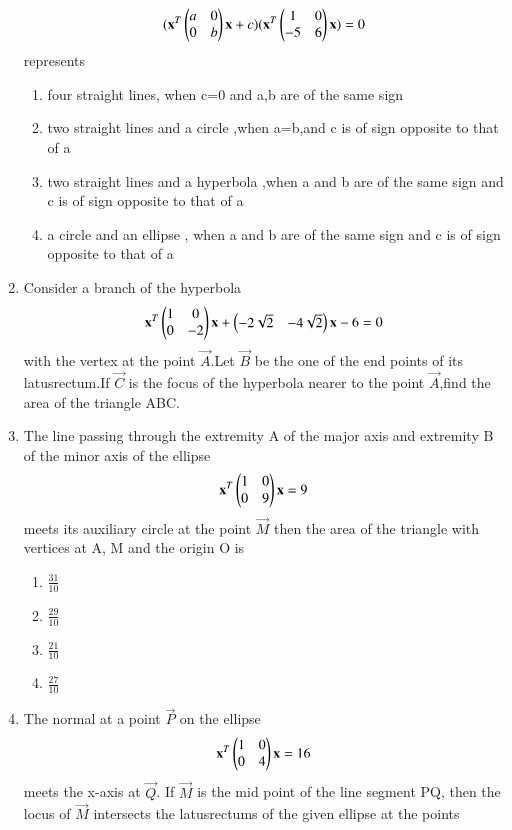 \begin{enumerate}[label=\arabic*.,ref=\thesubsection.\theenumi]
\begin{align}
    (\mathbf{x}^T\begin{pmatrix} a&0\\0&b \end{pmatrix}\mathbf{x}+c)(\mathbf{x}^T\begin{pmatrix}1&0\\-5&6\end{pmatrix} \mathbf{x})=0
    \end{align}represents
    \begin{enumerate}
    \item four straight lines, when c=0 and a,b are of the same sign 
    \item two straight lines and a circle ,when a=b,and c is of sign opposite to that of a
    \item two straight lines and a hyperbola ,when a and b are of the same sign and c is of sign 		opposite to that of a 
    \item a circle and an ellipse , when a and b are of the same sign and c is of sign opposite to that of a
    \end{enumerate}
    \item Consider a branch  of the hyperbola 
    \begin{align}
    \mathbf{x}^T\begin{pmatrix}1&0\\0&-2\end{pmatrix}\mathbf{x}+\begin{pmatrix}-2\sqrt{2}&-4\sqrt{2}\end{pmatrix}\mathbf{x}-6=0
    \end{align} with the vertex at the point $\vec{A}$.Let $\vec{B}$ be the one of the end points of 	its latusrectum.If $\vec{C}$ is the focus of the hyperbola nearer to the point $\vec{A}$,find the area of the triangle ABC.
    \item The line passing through the extremity A of the major axis and extremity B of the minor axis of the ellipse
    \begin{align}
    \mathbf{x}^T\begin{pmatrix}1&0\\0&9 \end{pmatrix}\mathbf{x} =9
    \end{align}
    meets its auxiliary circle at the point $\vec{M}$ then the area of the triangle with vertices at 	A, M and the origin O is
    \begin{enumerate}
    \item $\frac{31}{10}$
    \item $\frac{29}{10}$
    \item $\frac{21}{10}$
    \item $\frac{27}{10}$
    \end{enumerate}
    \item The normal at a point $\vec{P}$ on the ellipse 
    \begin{align}
    \mathbf{x}^T\begin{pmatrix}1&0\\0&4\end{pmatrix}\mathbf{x}=16
    \end{align} meets the x-axis at $\vec{Q}$. If $\vec{M}$ is the mid point of the line segment PQ, then the locus of $\vec{M}$ intersects the latusrectums of the given ellipse at the points

\end{enumerate}
